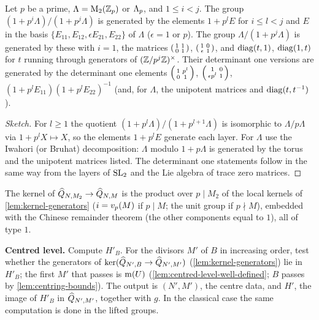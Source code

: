 \begin{lemma}\label{lem:kernel-generators}
Let $p$ be a prime, $\Lambda = \mathrm{M}_{2}(\mathbb{Z}_{p})$ or
$\Lambda_{p}$, and $1 \leq i < j$. The group
$(1 + p^i\Lambda)/(1 + p^j\Lambda)$ is generated by the elements $1 + p^{l}E$
for $i \leq l < j$ and $E$ in the basis
$\{E_{11}, E_{12}, \epsilon E_{21}, E_{22}\}$ of $\Lambda$ ($\epsilon = 1$ or
$p$). The group $\unit{\Lambda}/(1 + p^j\Lambda)$ is generated by these with
$i = 1$, the matrices $\left(\begin{smallmatrix} 1 & 1 \\ 0 & 1 \end{smallmatrix}\right)$, $\left(\begin{smallmatrix} 1 & 0 \\ \epsilon & 1 \end{smallmatrix}\right)$,
and $\mathrm{diag}(t,1)$, $\mathrm{diag}(1,t)$ for $t$ running through generators
of $(\mathbb{Z}/p^j\mathbb{Z})^{\times}$. Their determinant one versions are generated
by the determinant one elements $\left(\begin{smallmatrix} 1 & p^l \\ 0 & 1 \end{smallmatrix}\right)$,
$\left(\begin{smallmatrix} 1 & 0 \\ \epsilon p^l & 1 \end{smallmatrix}\right)$, $(1 + p^lE_{11})(1 + p^lE_{22})^{-1}$
(and, for $\unit{\Lambda}$, the unipotent matrices and
$\mathrm{diag}(t,t^{-1})$).
\end{lemma}

\begin{proof}[Sketch]
For $l \geq 1$ the quotient $(1 + p^l\Lambda)/(1 + p^{l+1}\Lambda)$ is
isomorphic to $\Lambda/p\Lambda$ via $1 + p^lX \mapsto X$, so the elements
$1 + p^lE$ generate each layer. For $\unit{\Lambda}$ use the Iwahori (or
Bruhat) decomposition: $\unit{\Lambda}$ modulo $1 + p\Lambda$ is generated by
the torus and the unipotent matrices listed. The determinant one statements
follow in the same way from the layers of $\SL{2}{}$ and the Lie algebra of
trace zero matrices.
\end{proof}

The kernel of $\widehat{Q}_{N,M_2} \to \widehat{Q}_{N,M}$ is
the product over $p \mid M_2$ of the local kernels of \cref{lem:kernel-generators}
($i = v_{p}(M)$ if $p \mid M$; the unit group if $p \nmid M$), embedded with
the Chinese remainder theorem (the other components equal to $1$), all of
type $1$.

\begin{procedure}
\textbf{Centred level.} Compute $H'_B$. For the divisors $M'$ of $B$ in
increasing order, test whether the generators of
$\ker(\widehat{Q}_{N',B} \to \widehat{Q}_{N',M'})$
(\cref{lem:kernel-generators}) lie in $H'_B$; the first $M'$ that passes is
$\operatorname{m}(U)$ (\cref{lem:centred-level-well-defined}; $B$ passes
by \cref{lem:centring-bounds}). The output is $(N', M')$, the centre data, and
$H'$, the image of $H'_B$ in $\widehat{Q}_{N',M'}$, together with $g$.
In the classical case the same computation is done in the lifted groups.
\end{procedure}

